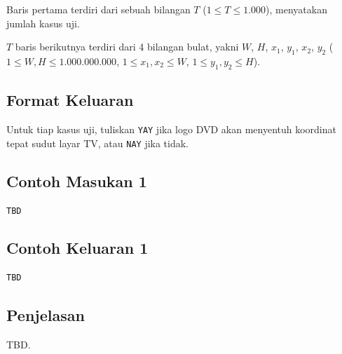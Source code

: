 \documentclass{article}
\begin{document}
Baris pertama terdiri dari sebuah bilangan $T$ ($1 \leq T \leq 1.000$), menyatakan jumlah kasus uji.

$T$ baris berikutnya terdiri dari 4 bilangan bulat, yakni $W$, $H$, $x_1$, $y_1$, $x_2$, $y_2$ ($1 \leq W, H \leq 1.000.000.000$, $1 \leq x_1, x_2 \leq W$, $1 \leq y_1, y_2 \leq H$).

\subsection*{Format Keluaran}

Untuk tiap kasus uji, tuliskan \lstinline{YAY} jika logo DVD akan menyentuh koordinat tepat sudut layar TV, atau \lstinline{NAY} jika tidak.
\\

\begin{multicols}{2}
\subsection*{Contoh Masukan 1}
\begin{lstlisting}
TBD
\end{lstlisting}
\columnbreak
\subsection*{Contoh Keluaran 1}
\begin{lstlisting}
TBD
\end{lstlisting}
\vfill
\null
\end{multicols}

\subsection*{Penjelasan}
TBD.

\pagebreak
\end{document}
